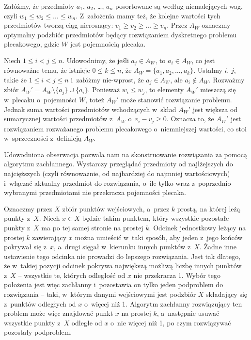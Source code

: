 \exercise %
Załóżmy, że przedmioty $a_1$, $a_2$, \dots, $a_n$ posortowane są według niemalejących wag, czyli $w_1\le w_2\le\dots\le w_n$.
Z~założenia mamy też, że kolejne wartości tych przedmiotów tworzą ciąg nierosnący: $v_1\ge v_2\ge\dots\ge v_n$.
Przez $A_W$ oznaczmy optymalny podzbiór przedmiotów będący rozwiązaniem dyskretnego problemu plecakowego, gdzie $W$ jest pojemnością plecaka.

Niech $1\le i<j\le n$.
Udowodnimy, że jeśli $a_j\in A_W$, to $a_i\in A_W$, co jest równoważne temu, że istnieje $0\le k\le n$, że $A_W=\{a_1,a_2,\dots,a_k\}$.
Ustalmy $i$, $j$, takie że $1\le i<j\le n$ i~załóżmy nie-wprost, że $a_j\in A_W$, ale $a_i\not\in A_W$.
Rozważmy zbiór $A_W'=A_W\setminus\{a_j\}\cup\{a_i\}$.
Ponieważ $w_i\le w_j$, to elementy $A_W'$ mieszczą się w~plecaku o~pojemności $W$, toteż $A_W'$ może stanowić rozwiązanie problemu.
Jednak suma wartości przedmiotów wchodzących w~skład $A_W'$ jest większa od sumarycznej wartości przedmiotów z~$A_W$ o~$v_i-v_j\ge0$.
Oznacza to, że $A_W'$ jest rozwiązaniem rozważanego problemu plecakowego o~niemniejszej wartości, co stoi w~sprzeczności z~definicją $A_W$.

Udowodniona obserwacja pozwala nam na skonstruowanie rozwiązania za pomocą algorytmu zachłannego.
Wystarczy przeglądać przedmioty od najlżejszych do najcięższych (czyli równoważnie, od najbardziej do najmniej wartościowych) i~włączać aktualny przedmiot do rozwiązania, o~ile tylko wraz z~poprzednio wybranymi przedmiotami nie przekracza pojemności plecaka.

\exercise %
\exercise %
Oznaczmy przez $X$ zbiór punktów wejściowych, a~przez $k$ prostą, na której leżą punkty z~$X$.
Niech $x\in X$ będzie takim punktem, który wszystkie pozostałe punkty z~$X$ ma po tej samej stronie na prostej $k$.
Odcinek jednostkowy leżący na prostej $k$ zawierający $x$ można umieścić w~taki sposób, aby jeden z~jego końców pokrywał się z~$x$, a~drugi sięgał w~kierunku innych punktów z~$X$.
Żadne inne ustawienie tego odcinka nie prowadzi do lepszego rozwiązania.
Jest tak dlatego, że w~takiej pozycji odcinek pokrywa największą możliwą liczbę innych punktów z~$X$ -- wszystkie te, których odległość od $x$ nie przekracza 1.
Wybór tego położenia jest więc zachłanny i~pozostawia on tylko jeden podproblem do rozwiązania -- taki, w~którym danymi wejściowymi jest podzbiór $X$ składający się z~punktów odległych od $x$ o~więcej niż 1.
Algorytm zachłanny rozwiązujący ten problem może więc znajdować punkt $x$ na prostej $k$, a~następnie usuwać wszystkie punkty z~$X$ odległe od $x$ o~nie więcej niż 1, po czym rozwiązywać pozostały podproblem.

